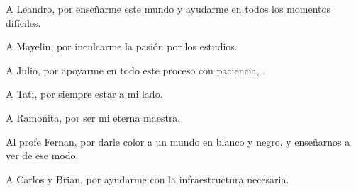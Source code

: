 \begin{acknowledgements}

A Leandro, por ense\~narme este mundo y ayudarme en todos los momentos dif\'iciles. 

\vspace{1em}

A Mayelin, por inculcarme la pasi\'on por los estudios.

\vspace{1em}

A Julio, por apoyarme en todo este proceso con paciencia, .

\vspace{1em}

A Tati, por siempre estar a mi lado.

\vspace{1em}

A Ramonita, por ser mi eterna maestra.

\vspace{1em}

Al profe Fernan, por darle color a un mundo en blanco y negro, y enseñarnos a ver de ese modo.

\vspace{1em}

A Carlos y Brian, por ayudarme con la infraestructura necesaria.

\end{acknowledgements}